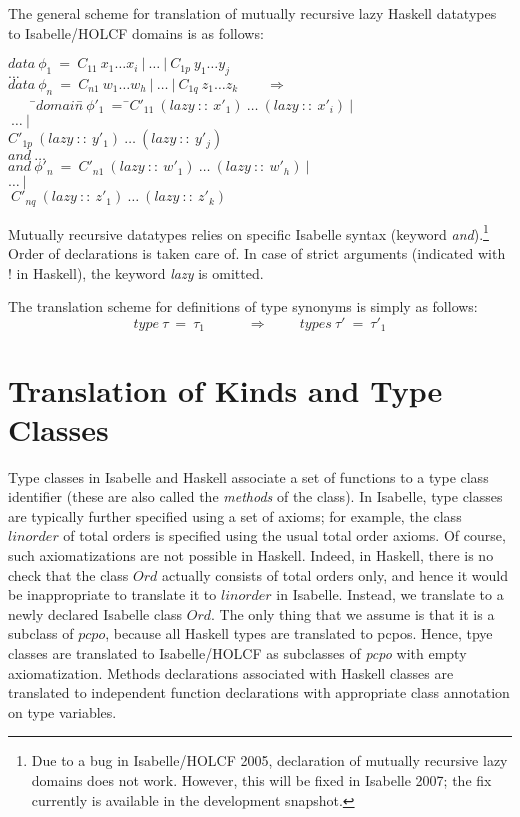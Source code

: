 \documentclass{llncs}
\begin{document}
The general scheme for translation of mutually recursive lazy Haskell
datatypes to Isabelle/HOLCF domains is as follows:
\begin{tabbing}
$ data \ \phi_1 \ = \ C_{11} \ x_1 \ldots x_i
  \ | \ \ldots \ | \ C_{1p} \ y_1 \ldots y_j $ \\
$ \ldots $ \\
$ data \ \phi_n \ = \ C_{n1} \ w_1 \ldots w_h
  \ | \ \ldots \ | \ C_{1q} \ z_1 \ldots z_k \qquad \Longrightarrow $ \\
$  \qquad $\=$ domain$\=$ \ \phi'_1 \ = \  $\=$ C'_{11} \ (lazy~ ::\ x'_1) \ \ldots \ (lazy~ :: \ 
  x'_i) \ |$\\
\>\>\>$ \ \ldots \ | \ $\\
\>\>\>$ C'_{1p} \ 
  (lazy~ :: \ y'_1) \ \ldots \ (lazy~ :: \ y'_j) $\\
\>$  and \ \ldots $\\
\>$  and \ $\>$\phi'_n \ = \ C'_{n1} \ (lazy~ :: \ w'_1) \ \ldots \ (lazy~ :: \ 
  w'_h) \ | \ $\\
\>\>\>$\ldots \ | $\\
\>\>\>$\  C'_{nq} \ 
  (lazy~ :: \ z'_1) \ \ldots \ (lazy~ :: \ z'_k) $\\
\end{tabbing}
Mutually recursive datatypes relies on specific Isabelle syntax
(keyword \emph{and}).\footnote {Due to a bug in Isabelle/HOLCF 2005,
  declaration of mutually recursive lazy domains does not work.
  However, this will be fixed in Isabelle 2007; the fix currently is
  available in the development snapshot.} Order of declarations is
taken care of. In case of strict arguments (indicated with ! in
Haskell), the keyword \emph{lazy} is omitted.

The translation scheme for definitions of type synonyms is simply as follows:
$$  type \ \tau \ = \ \tau_1 \quad \qquad \Longrightarrow \qquad
  \ types \ \tau' \ = \ \tau'_1 
$$


\section{Translation of Kinds and Type Classes}

Type classes in Isabelle and Haskell associate a set of functions to a
type class identifier (these are also called the \emph{methods} of the
class). In Isabelle, type classes are typically further specified
using a set of axioms; for example, the class
$\mathit{linorder}$ of total orders is specified using the
usual total order axioms. Of course, such axiomatizations are not
possible in Haskell. Indeed, in Haskell, there is no check that the
class $Ord$ actually consists of total orders only, and hence it would
be inappropriate to translate it to $\mathit{linorder}$ in Isabelle.
Instead, we translate to a newly declared Isabelle class $Ord$.
The only thing that we assume is that it is a subclass of $pcpo$,
because all Haskell types are translated to pcpos.
Hence, tpye classes are translated to Isabelle/HOLCF as subclasses of
\emph{pcpo} with empty axiomatization.
Methods declarations associated with
Haskell classes are translated to independent function declarations with
appropriate class annotation on type variables. 
\end{document}
